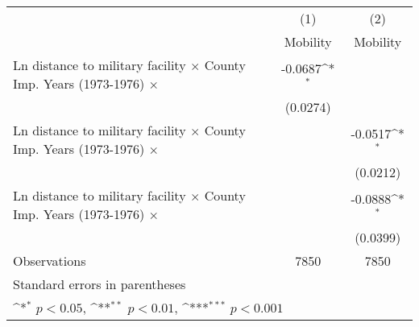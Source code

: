 {
\def\sym#1{\ifmmode^{#1}\else\(^{#1}\)\fi}
\begin{tabular}{l*{2}{c}}
\hline\hline
                    &\multicolumn{1}{c}{(1)}&\multicolumn{1}{c}{(2)}\\
                    &\multicolumn{1}{c}{Mobility}&\multicolumn{1}{c}{Mobility}\\
\hline
Ln distance to military facility $\times$ County Imp. Years (1973-1976) $\times$&     -0.0687\sym{*}  &                     \\
                    &    (0.0274)         &                     \\
[1em]
Ln distance to military facility $\times$ County Imp. Years (1973-1976) $\times$&                     &     -0.0517\sym{*}  \\
                    &                     &    (0.0212)         \\
[1em]
Ln distance to military facility $\times$ County Imp. Years (1973-1976) $\times$&                     &     -0.0888\sym{*}  \\
                    &                     &    (0.0399)         \\
\hline
Observations        &        7850         &        7850         \\
\hline\hline
\multicolumn{3}{l}{\footnotesize Standard errors in parentheses}\\
\multicolumn{3}{l}{\footnotesize \sym{*} \(p<0.05\), \sym{**} \(p<0.01\), \sym{***} \(p<0.001\)}\\
\end{tabular}
}

